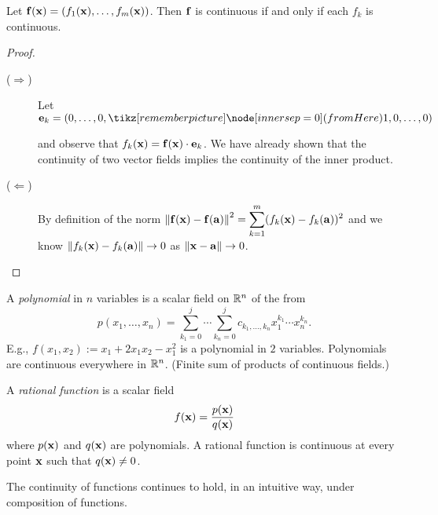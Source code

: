 \begin{theorem}
    Let \(\mathbf{f}(\mathbf{x}) = \left(f_1(\mathbf{x}),\ldots,f_m(\mathbf{x}) \right)\).
    Then \(\mathbf{f}\) is continuous if and only if each \(f_k\) is continuous.
\end{theorem}
\begin{proof}
    \begin{description}
        \item[(\(\Rightarrow\))]
            Let
            \( \ee_k=(0,\ldots,0,\here{1}{fromHere},0,\ldots,0)  \)
            and observe that \(f_k(\mathbf{x}) = \mathbf{f}(\mathbf{x})\cdot \mathbf{e}_k\).
            We have already shown that the continuity of two vector fields implies the continuity of the inner product.
        \item[(\(\Leftarrow \))]
            By definition of the norm
            \(\left\|\mathbf{f}(\mathbf{x})-\mathbf{f}(\mathbf{a})\right\|^2 = \displaystyle\sum_{k=1}^{m}(f_k(\mathbf{x})-f_k(\mathbf{a}))^2\)
            and we know \(\left\|f_k(\mathbf{x})-f_k(\mathbf{a})\right\| \to 0\) as \(\left\|\mathbf{x}-\mathbf{a}\right\|\to 0\). \qedhere
    \end{description}
\end{proof}



\begin{example*}[polynomials]
    A  \emph{polynomial} in \(n\) variables is a scalar field on \(\mathbb{R}^n\) of the from
    \[
        p(x_1,\ldots,x_n)
        = \sum_{k_1=0}^{j}\cdots \sum_{k_n=0}^{j} c_{k_1,\dots,k_n} x_1^{k_1}\cdots x_n^{k_n}.
    \]
    E.g., \(f(x_1,x_2):= x_1 + 2x_1x_2 - x_1^2\) is a polynomial in \(2\) variables.
    Polynomials are continuous everywhere in \(\mathbb{R}^n\). (Finite sum of products of continuous fields.)
\end{example*}

\begin{example*}
    A  \emph{rational function} is a scalar field
    \[
        f(\mathbf{x})=\frac{p(\mathbf{x})}{q(\mathbf{x})}
    \]
    where \(p(\mathbf{x})\) and \(q(\mathbf{x})\) are polynomials.
    A rational function is continuous at every point \(\mathbf{x}\) such that \(q(\mathbf{x})\neq 0\).
\end{example*}

The continuity of functions continues to hold, in an intuitive way, under composition of functions.

